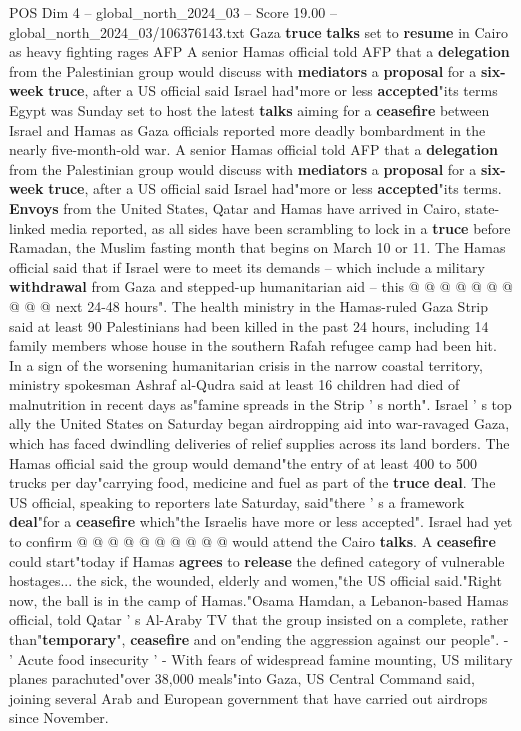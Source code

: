 \begin{textsample}{POS Dim 4 – global\_north\_2024\_03 – Score 19.00 – global\_north\_2024\_03/106376143.txt}  \label{ex:f4_pos_238}
Gaza \textbf{truce} \textbf{talks} set to \textbf{resume} in Cairo as heavy fighting rages AFP A senior Hamas official told AFP that a \textbf{delegation} from the Palestinian group would discuss with \textbf{mediators} a \textbf{proposal} for a \textbf{six-week} \textbf{truce}, after a US official said Israel had"more or less \textbf{accepted}"its terms Egypt was Sunday set to host the latest \textbf{talks} aiming for a \textbf{ceasefire} between Israel and Hamas as Gaza officials reported more deadly bombardment in the nearly five-month-old war.
A senior Hamas official told AFP that a \textbf{delegation} from the Palestinian group would discuss with \textbf{mediators} a \textbf{proposal} for a \textbf{six-week} \textbf{truce}, after a US official said Israel had"more or less \textbf{accepted}"its terms. \textbf{Envoys} from the United States, Qatar and Hamas have arrived in Cairo, state-linked media reported, as all sides have been scrambling to lock in a \textbf{truce} before Ramadan, the Muslim fasting month that begins on March 10 or 11.
The Hamas official said that if Israel were to meet its demands -- which include a military \textbf{withdrawal} from Gaza and stepped-up humanitarian aid -- this @ @ @ @ @ @ @ @ @ @ next 24-48 hours".
The health ministry in the Hamas-ruled Gaza Strip said at least 90 Palestinians had been killed in the past 24 hours, including 14 family members whose house in the southern Rafah refugee camp had been hit.
In a sign of the worsening humanitarian crisis in the narrow coastal territory, ministry spokesman Ashraf al-Qudra said at least 16 children had died of malnutrition in recent days as"famine spreads in the Strip ' s north".
Israel ' s top ally the United States on Saturday began airdropping aid into war-ravaged Gaza, which has faced dwindling deliveries of relief supplies across its land borders.
The Hamas official said the group would demand"the entry of at least 400 to 500 trucks per day"carrying food, medicine and fuel as part of the \textbf{truce} \textbf{deal}.
The US official, speaking to reporters late Saturday, said"there ' s a framework \textbf{deal}"for a \textbf{ceasefire} which"the Israelis have more or less accepted".
Israel had yet to confirm @ @ @ @ @ @ @ @ @ @ would attend the Cairo \textbf{talks}.
A \textbf{ceasefire} could start"today if Hamas \textbf{agrees} to \textbf{release} the defined category of vulnerable hostages... the sick, the wounded, elderly and women,"the US official said."Right now, the ball is in the camp of Hamas."Osama Hamdan, a Lebanon-based Hamas official, told Qatar ' s Al-Araby TV that the group insisted on a complete, rather than"\textbf{temporary}", \textbf{ceasefire} and on"ending the aggression against our people". - ' Acute food insecurity ' - With fears of widespread famine mounting, US military planes parachuted"over 38,000 meals"into Gaza, US Central Command said, joining several Arab and European government that have carried out airdrops since November.

\end{textsample}

